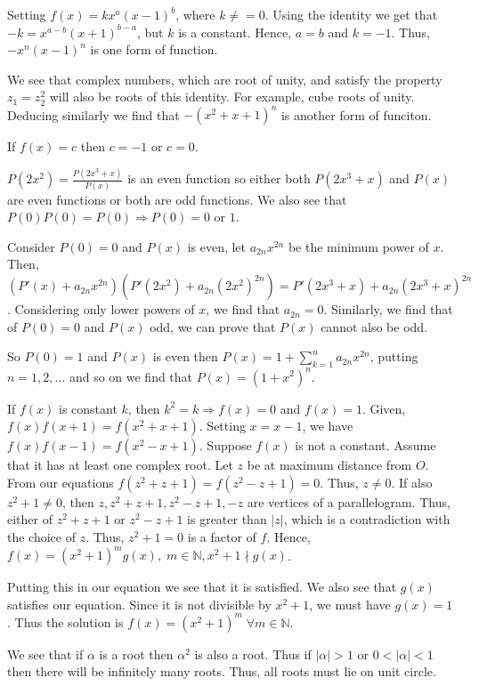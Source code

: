   Setting $f(x) = kx^a(x - 1)^b$, where $k\neq = 0$. Using the identity we get that $-k = x^{a - b}(x +
  1)^{b - a}$, but $k$ is a constant. Hence, $a = b$ and $k = -1$. Thus, $-x^n(x - 1)^n$ is one form of
  function.

  We see that complex numbers, which are root of unity, and satisfy the property $z_1 = z_2^2$ will also be
  roots of this identity. For example, cube roots of unity. Deducing similarly we find that $-(x^2 + x +
  1)^n$ is another form of funciton.

  If $f(x) = c$ then $c = -1$ or $c = 0$.
\item $P(2x^2) = \frac{P(2x^3 + x)}{P(x)}$ is an even function so either both $P(2x^3 + x)$ and $P(x)$ are
  even functions or both are odd functions. We also see that $P(0)P(0) = P(0)\Rightarrow P(0) = 0$ or $1$.

  Consider $P(0) = 0$ and $P(x)$ is even, let $a_{2n}x^{2n}$ be the minimum power of $x$. Then, $(P'(x) +
  a_{2n}x^{2n})(P'(2x^2) + a_{2n}(2x^2)^{2n}) = P'(2x^3 + x) + a_{2n}(2x^3 + x)^{2n}$. Considering only
  lower powers of $x$, we find that $a_{2n} = 0$. Similarly, we find that of $P(0) = 0$ and $P(x)$ odd, we
  can prove that $P(x)$ cannot also be odd.

  So $P(0) = 1$ and $P(x)$ is even then $P(x) = 1 + \sum_{k=1}^na_{2n}x^{2n}$, putting $n = 1, 2, \ldots$
  and so on we find that $P(x) = (1 + x^2)^n$.
\item If $f(x)$ is constant $k$, then $k^2 = k \Rightarrow f(x) = 0$ and $f(x) = 1$. Given, $f(x)f(x + 1) =
  f(x^2 + x +1)$. Setting $x = x - 1$, we have $f(x)f(x - 1) = f(x^2 - x + 1)$. Suppose $f(x)$ is not a
  constant. Assume that it has at least one complex root. Let $z$ be at maximum distance from $O$. From our
  equations $f(z^2 + z + 1) = f(z^2 - z + 1) = 0$. Thus, $z\neq 0$. If also $z^2 + 1 \neq 0$, then $z, z^2 + z
  + 1, z^2 - z + 1, -z$ are vertices of a parallelogram. Thus, either of $z^2 + z + 1$ or $z^2 - z + 1$ is
  greater than $|z|$, which is a contradiction with the choice of $z$. Thus, $z^2 + 1 = 0$ is a factor of
  $f$. Hence, $f(x) = (x^2 + 1)^mg(x),\;m\in\mathbb{N}, x^2 + 1\nmid g(x)$.

  Putting this in our equation we see that it is satisfied. We also see that $g(x)$ satisfies our
  equation. Since it is not divisible by $x^2 + 1$, we must have $g(x) = 1$. Thus the solution is $f(x) =
  (x^2 + 1)^m\;\forall m\in\mathbb{N}$.
\item We see that if $\alpha$ is a root then $\alpha^2$ is also a root. Thus if $|\alpha| > 1$ or $0 < |\alpha|
  < 1$ then there will be infinitely many roots. Thus, all roots must lie on unit circle.

